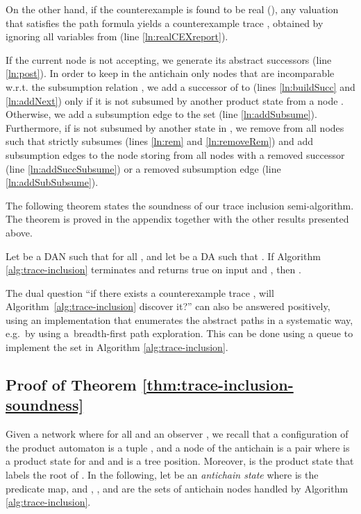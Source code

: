 \documentclass{llncs}
\begin{document}
On the other hand, if the counterexample  is found to be real
(), any valuation  that
satisfies the path formula  yields a counterexample
trace , obtained by ignoring all variables from
 (line
\ref{ln:realCEXreport}).

If the current node is not accepting, we generate its abstract
successors (line \ref{ln:post}). In order to keep in the antichain
only nodes that are incomparable w.r.t. the subsumption relation
, we add a successor  of  to  (lines
\ref{ln:buildSucc} and \ref{ln:addNext}) only if it is not subsumed by
another product state from a node . Otherwise,
we add a subsumption edge  to the set
 (line \ref{ln:addSubsume}). Furthermore, if  is
not subsumed by another state in , we remove from
 all nodes  such that  strictly
subsumes  (lines \ref{ln:rem} and \ref{ln:removeRem}) and add
subsumption edges to the node storing  from all nodes with a
removed successor (line \ref{ln:addSuccSubsume}) or a removed
subsumption edge (line \ref{ln:addSubSubsume}).

The following theorem states the soundness of our trace inclusion
semi-algorithm. The theorem is proved in the appendix together with
the other results presented above.

\begin{theorem}\label{thm:trace-inclusion-soundness}
  Let  be a DAN such that 
  for all , and let  be a
  DA such that . If
  Algorithm \ref{alg:trace-inclusion} terminates and returns true on
  input  and , then
  . 
\end{theorem}

The dual question ``if there exists a counterexample trace ,
will Algorithm~\ref{alg:trace-inclusion} discover it?'' can also be
answered positively, using an implementation that enumerates the
abstract paths in a systematic way, e.g.\ by using a~breadth-first
path exploration. This can be done using a queue to implement the
 set in Algorithm \ref{alg:trace-inclusion}.

\subsection{Proof of Theorem \ref{thm:trace-inclusion-soundness}}


Given a network  where  for
all  and an observer , we
recall that a configuration of the product automaton  is a tuple , and a node of the antichain
 is a pair  where  is a product state for
 and  and  is a tree position. Moreover,
 is the product
state that labels the root of .  In the following, let
 be an
\emph{antichain state} where  is the predicate map, and
, , and  are the
sets of antichain nodes handled by Algorithm
\ref{alg:trace-inclusion}.
\end{document}
